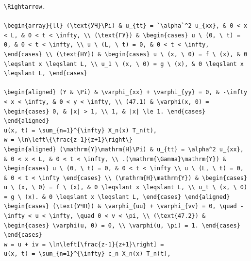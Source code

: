 \documentclass[
  ukrainian,
]{article}
\begin{document}
\begin{verbatim}
\Rightarrow.

\begin{array}{ll} (\text{УЧ}\Pi) & u_{tt} = `\alpha`^2 u_{xx}, & 0 < x < L, & 0 < t < \infty, \\ (\text{ГУ}) & \begin{cases} u \ (0, \ t) = 0, & 0 < t < \infty, \\ u \ (L, \ t) = 0, & 0 < t < \infty, \end{cases} \\ (\text{HY}) & \begin{cases} u \ (x, \ 0) = f \ (x), & 0 \leqslant x \leqslant L, \\ u_1 \ (x, \ 0) = g \ (x), & 0 \leqslant x \leqslant L, \end{cases}

\begin{aligned} (Y & \Pi) & \varphi_{xx} + \varphi_{yy} = 0, & -\infty < x < \infty, & 0 < y < \infty, \\ (47.1) & \varphi(x, 0) = \begin{cases} 0, & |x| > 1, \\ 1, & |x| \le 1. \end{cases} \end{aligned}
u(x, t) = \sum_{n=1}^{\infty} X_n(x) T_n(t),
w = \ln\left\{\frac{z-1}{z+1}\right\}
\begin{aligned} (\mathrm{Y}\mathrm{H}\Pi) & u_{tt} = \alpha^2 u_{xx}, & 0 < x < L, & 0 < t < \infty, \\ .(\mathrm{\Gamma}\mathrm{Y}) & \begin{cases} u \ (0, \ t) = 0, & 0 < t < \infty \\ u \ (L, \ t) = 0, & 0 < t < \infty \end{cases} \\ (\mathrm{H}\mathrm{Y}) & \begin{cases} u \ (x, \ 0) = f \ (x), & 0 \leqslant x \leqslant L, \\ u_t \ (x, \ 0) = g \ (x). & 0 \leqslant x \leqslant L, \end{cases} \end{aligned}
\begin{cases} (\text{УЧП}) & \varphi_{uu} + \varphi_{vv} = 0, \quad -\infty < u < \infty, \quad 0 < v < \pi, \\ (\text{47.2}) & \begin{cases} \varphi(u, 0) = 0, \\ \varphi(u, \pi) = 1. \end{cases} \end{cases}
w = u + iv = \ln\left[\frac{z-1}{z+1}\right] =
u(x, t) = \sum_{n=1}^{\infty} c_n X_n(x) T_n(t),
\end{verbatim}
\end{document}
